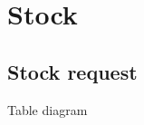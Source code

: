 \documentclass[letterpaper,10pt,english,openany,oneside]{sphinxmanual}
\begin{document}
\section{Stock}
\label{\detokenize{module/module:stock}}

\subsection{Stock request}
\label{\detokenize{module/module:stock-request}}
\sphinxAtStartPar
Table diagram

\begin{sphinxVerbatim}[commandchars=\\\{\}]
      
                              
    
                              
      
\end{sphinxVerbatim}
\end{document}
